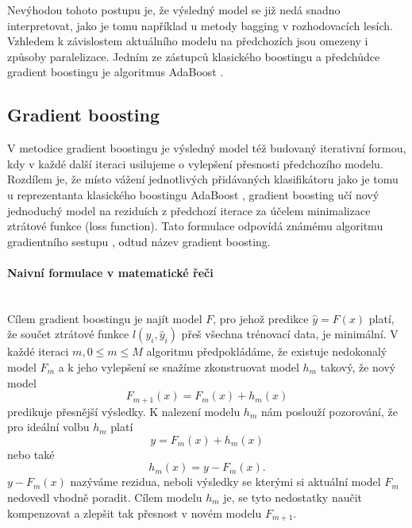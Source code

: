 \documentclass[a4paper]{article}
\begin{document}
Nevýhodou tohoto postupu je, že výsledný model se již nedá snadno interpretovat, jako je tomu například u metody bagging v rozhodovacích lesích. Vzhledem k závislostem aktuálního modelu na předchozích jsou omezeny i způsoby paralelizace. Jedním ze zástupců klasického boostingu a předchůdce gradient boostingu je algoritmus AdaBoost \cite{freund1997decision}.

\subsection{Gradient boosting}
 V metodice gradient boostingu je výsledný model též budovaný iterativní formou, kdy v každé další iteraci usilujeme o vylepšení přesnosti předchozího modelu. Rozdílem je, že místo vážení jednotlivých přidávaných klasifikátoru jako je tomu u reprezentanta klasického boostingu AdaBoost \cite{freund1997decision}, gradient boosting učí nový jednoduchý model na reziduích z předchozí iterace za účelem minimalizace ztrátové funkce (loss function). Tato formulace odpovídá známému algoritmu gradientního sestupu \cite{wiki:gradientdescent}, odtud název gradient boosting.

\paragraph{Naivní formulace v matematické řeči} \mbox{} \\
Cílem gradient boostingu je najít model $F$, pro jehož predikce $\hat{y} = F(x)$ platí, že součet ztrátové funkce $l(y_i, \hat{y}_i)$ přeš všechna trénovací data, je minimální. V každé iteraci $m, 0 \leq m \leq M$ algoritmu předpokládáme, že existuje nedokonalý model $F_m$ a k jeho vylepšení se snažíme zkonstruovat model $h_m$ takový, že nový model 
    \begin{equation}\label{eq:eq1}
        F_{m+1}(x) = F_m(x) + h_m(x) 
    \end{equation} 
predikuje přesnější výsledky. K nalezení modelu $h_m$ nám poslouží pozorování, že pro ideální volbu $h_m$ platí
    \begin{equation}
        y = F_m(x) + h_m(x)
    \end{equation} 
nebo také
    \begin{equation}
        h_m(x) = y - F_m(x).
    \end{equation} 
$y - F_m(x)$ nazýváme rezidua, neboli výsledky se kterými si aktuální model $F_m$ nedovedl vhodně poradit. Cílem modelu $h_m$ je, se tyto nedostatky naučit kompenzovat a zlepšit tak přesnost v novém modelu $F_{m+1}$. 
\end{document}
